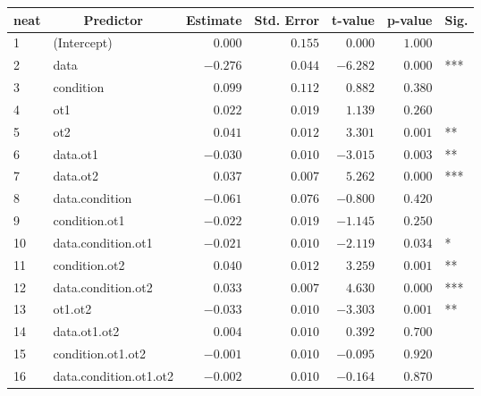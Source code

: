 \begin{table}[!tbp]
\begin{center}
\begin{tabular}{llrrrrl}
\hline\hline
\multicolumn{1}{l}{neat}&\multicolumn{1}{c}{Predictor}&\multicolumn{1}{c}{Estimate}&\multicolumn{1}{c}{Std. Error}&\multicolumn{1}{c}{t-value}&\multicolumn{1}{c}{p-value}&\multicolumn{1}{c}{Sig.}\tabularnewline
\hline
1&(Intercept)&$ 0.000$&$0.155$&$ 0.000$&$1.000$& \tabularnewline
2&data&$-0.276$&$0.044$&$-6.282$&$0.000$&***\tabularnewline
3&condition&$ 0.099$&$0.112$&$ 0.882$&$0.380$& \tabularnewline
4&ot1&$ 0.022$&$0.019$&$ 1.139$&$0.260$& \tabularnewline
5&ot2&$ 0.041$&$0.012$&$ 3.301$&$0.001$&**\tabularnewline
6&data.ot1&$-0.030$&$0.010$&$-3.015$&$0.003$&**\tabularnewline
7&data.ot2&$ 0.037$&$0.007$&$ 5.262$&$0.000$&***\tabularnewline
8&data.condition&$-0.061$&$0.076$&$-0.800$&$0.420$& \tabularnewline
9&condition.ot1&$-0.022$&$0.019$&$-1.145$&$0.250$& \tabularnewline
10&data.condition.ot1&$-0.021$&$0.010$&$-2.119$&$0.034$&*\tabularnewline
11&condition.ot2&$ 0.040$&$0.012$&$ 3.259$&$0.001$&**\tabularnewline
12&data.condition.ot2&$ 0.033$&$0.007$&$ 4.630$&$0.000$&***\tabularnewline
13&ot1.ot2&$-0.033$&$0.010$&$-3.303$&$0.001$&**\tabularnewline
14&data.ot1.ot2&$ 0.004$&$0.010$&$ 0.392$&$0.700$& \tabularnewline
15&condition.ot1.ot2&$-0.001$&$0.010$&$-0.095$&$0.920$& \tabularnewline
16&data.condition.ot1.ot2&$-0.002$&$0.010$&$-0.164$&$0.870$& \tabularnewline
\hline
\end{tabular}\end{center}
\end{table}
